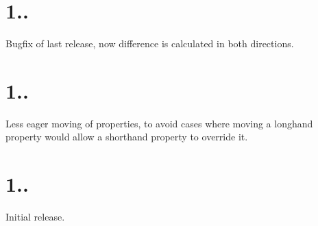 \section*{1..}


\begin{DoxyItemize}
\item Bugfix of last release, now difference is calculated in both directions.
\end{DoxyItemize}

\section*{1..}


\begin{DoxyItemize}
\item Less eager moving of properties, to avoid cases where moving a longhand property would allow a shorthand property to override it.
\end{DoxyItemize}

\section*{1..}


\begin{DoxyItemize}
\item Initial release. 
\end{DoxyItemize}